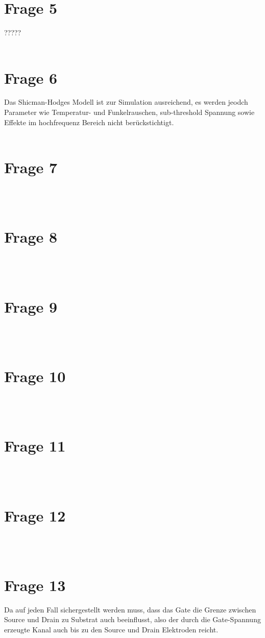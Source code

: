 \documentclass[a4paper]{scrartcl}
\begin{document}
\section*{Frage 5}
?????
~\\
~\\
\section*{Frage 6}
Das Shicman-Hodges Modell ist zur Simulation ausreichend, es werden jeodch Parameter wie Temperatur- und Funkelrauschen, sub-threshold Spannung sowie Effekte im hochfrequenz Bereich nicht berückstichtigt.
~\\
~\\
\section*{Frage 7}

~\\
~\\
\section*{Frage 8}

~\\
~\\
\section*{Frage 9}

~\\
~\\
\section*{Frage 10}

~\\
~\\
\section*{Frage 11}

~\\
~\\
\section*{Frage 12}

~\\
~\\
\section*{Frage 13}
Da auf jeden Fall sichergestellt werden muss, dass das Gate die Grenze zwischen Source und Drain zu Substrat auch beeinflusst, also der durch die Gate-Spannung erzeugte Kanal auch bis zu den Source und Drain Elektroden reicht.
~\\
~\\
\end{document}
